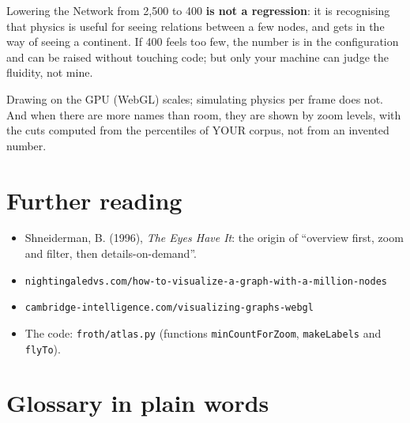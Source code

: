 \documentclass[11pt,a4paper]{article}
\begin{document}
Lowering the Network from 2,500 to 400 \textbf{is not a regression}: it is recognising that
physics is useful for seeing relations between a few nodes, and gets in the way of seeing a
continent. If 400 feels too few, the number is in the configuration and can be raised without
touching code; but only your machine can judge the fluidity, not mine.

\begin{resumen}
Drawing on the GPU (WebGL) scales; simulating physics per frame does not. And when there are
more names than room, they are shown by zoom levels, with the cuts computed from the percentiles
of YOUR corpus, not from an invented number.
\end{resumen}

\section{Further reading}

\begin{itemize}
  \item Shneiderman, B. (1996), \emph{The Eyes Have It}: the origin of ``overview first, zoom
        and filter, then details-on-demand''.
  \item \texttt{nightingaledvs.com/how-to-visualize-a-graph-with-a-million-nodes}
  \item \texttt{cambridge-intelligence.com/visualizing-graphs-webgl}
  \item The code: \texttt{froth/atlas.py} (functions \texttt{minCountForZoom},
        \texttt{makeLabels} and \texttt{flyTo}).
\end{itemize}
\clearpage
{}
{}

\section{Glossary in plain words}
\end{document}
